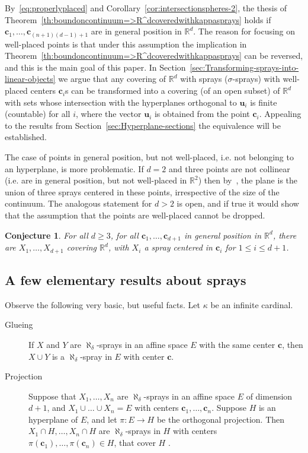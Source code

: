 \documentclass[12pt]{amsart}
\newcommand{\R}{\mathbb{R}}	%
\theoremstyle{plain}
\newtheorem{conjecture}[theorem]{Conjecture}
\theoremstyle{definition}
\theoremstyle{remark}
\begin{document}
By~\eqref{eq:properlyplaced} and Corollary~\ref{cor:intersectionspheres-2}, the thesis of Theorem~\ref{th:boundoncontinuum=>R^dcoveredwithkappasprays} holds if \( \mathbf{c}_1 , \dots , \mathbf{c}_{ ( n + 1 ) (d - 1 ) + 1 }\) are in general position in \( \R^d \).
The reason for focusing on well-placed points is that under this assumption the implication in Theorem~\ref{th:boundoncontinuum=>R^dcoveredwithkappasprays} can be reversed, and this is the main goal of this paper.
In Section~\ref{sec:Transforming-sprays-into-linear-objects} we argue that any covering of \( \R^d \) with sprays (\( \sigma \)-sprays) with well-placed centers \( \mathbf{c}_i \)s can be transformed into a covering (of an open subset) of \( \R^d \) with sets whose intersection with the hyperplanes orthogonal to \( \mathbf{u}_i \) is finite (countable) for all \( i \), where the vector \( \mathbf{u}_i \) is obtained from the point \( \mathbf{c}_i \).
Appealing to the results from Section~\ref{sec:Hyperplane-sections} the equivalence will be established.

The case of points in general position, but not well-placed, i.e. not belonging to an hyperplane, is more problematic.
If \( d = 2 \) and three points are not collinear (i.e. are in general position, but not well-placed in \( \R^2 \)) then by~\cite[Theorem 1]{Schmerl:2010nr}, the plane is the union of three sprays centered in these points, irrespective of the size of the continuum.
The analogous statement for \( d > 2 \) is open, and if true it would show that the assumption that the points are well-placed cannot be dropped.
\begin{conjecture}
For all \( d \geq 3 \), for all \( \mathbf{c}_1 , \dots , \mathbf{c}_{d + 1 } \) in general position in \( \R^d \), there are \( X_1 , \dots , X_{ d + 1 } \) covering \( \R^d \), with \( X_i \) a spray centered in \( \mathbf{c}_i \) for \( 1 \leq i \leq d + 1 \).
\end{conjecture}

\subsection{A few elementary results about sprays} 
Observe the following very basic, but useful facts.
Let \( \kappa \) be an infinite cardinal.

\begin{description}
\item[Glueing]
If \( X \) and \( Y \) are \( \aleph_ \delta \)-sprays in an affine space \( E \) with the same center \( \mathbf{c} \), then \( X \cup Y \) is a \( \aleph_ \delta \)-spray in \( E \) with center \( \mathbf{c} \).
\item[Projection]
Suppose that \( X_1 , \dots , X_n \) are \( \aleph_ \delta \)-sprays in an affine space \( E \) of dimension \( d + 1 \), and \( X_1 \cup \dots \cup X_n = E \) with centers \( \mathbf{c}_1 , \dots , \mathbf{c}_n \).
Suppose \( H \) is an hyperplane of \( E \), and let \( \pi \colon E \to H \) be the orthogonal projection.
Then \( X_1 \cap H , \dots , X_n \cap H \) are \( \aleph_ \delta \)-sprays in \( H \) with centers \( \pi ( \mathbf{c}_1 ) , \dots , \pi ( \mathbf{c}_n ) \in H \), that cover \( H \) .
\end{description}
\end{document}
